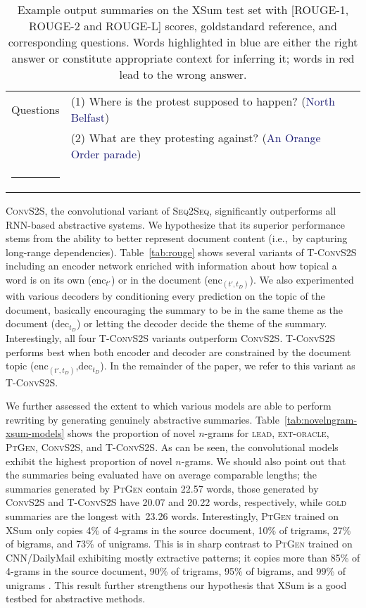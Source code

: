 \documentclass[11pt,a4paper]{article}
\makeatletter
\newcommand{\thickhline}{\noalign {\ifnum 0=`}\fi \hrule height 1pt
    \futurelet \reserved@a \@xhline
}
\makeatother
\begin{document}
\begin{table*}[t!]
{\begin{tabular}{l p{10.5cm} l}
      Questions &(1) {Where is the protest supposed to happen?}
      (\textcolor{midnightblue}{North Belfast}) \\ 
&(2) {What are they protesting against?} (\textcolor{midnightblue}{An Orange Order parade}) \\
      \thickhline

    \end{tabular}     
  }
  \caption{Example output summaries on the XSum test set with [ROUGE-1,
    ROUGE-2 and ROUGE-L] scores, goldstandard reference, and
    corresponding questions. Words highlighted in blue are either the
    right answer or constitute appropriate context for inferring it;
    words in red lead to the wrong
    answer. }\label{tab:erroranalysis}
\end{table*}


\textsc{ConvS2S}, the convolutional variant of \textsc{Seq2Seq},
significantly outperforms all \mbox{RNN-based} abstractive systems. We
hypothesize that its superior performance stems from the ability to
better represent document content (i.e.,~by capturing long-range
dependencies).
Table~\ref{tab:rouge} shows several variants of \textsc{T-ConvS2S}
including an encoder network enriched with information about how
topical a word is on its own (enc$_{t'}$) or in the document
(enc$_{(t',t_D)}$).  We also experimented with various decoders by
conditioning every prediction on the topic of the document, basically
encouraging the summary to be in the same theme as the document
(dec$_{t_D}$) or letting the decoder decide the theme of the
summary. Interestingly, all four \textsc{T-ConvS2S} variants
outperform \textsc{ConvS2S}. \textsc{T-ConvS2S} performs best when
both encoder and decoder are constrained by the document topic
(enc$_{(t',t_D)}$,dec$_{t_D}$). In the remainder of the paper, we
refer to this variant as \textsc{T-ConvS2S}.

We further assessed the extent to which various models are able to
perform rewriting by generating genuinely abstractive
summaries. Table~\ref{tab:novelngram-xsum-models} shows the proportion
of novel $n$-grams for \textsc{lead}, \textsc{ext-oracle},
\textsc{PtGen}, \textsc{ConvS2S}, and \textsc{T-ConvS2S}.  As can be
seen, the convolutional models exhibit the highest proportion of novel
$n$-grams. We should also point out that the summaries being evaluated
have on average comparable lengths; the summaries generated by
\textsc{PtGen} contain 22.57 words, those generated by
\textsc{ConvS2S} and \textsc{T-ConvS2S} have 20.07 and 20.22 words,
respectively, while \textsc{gold} summaries are the longest with~23.26
words.  Interestingly, \textsc{PtGen} trained on XSum only copies 4\%
of 4-grams in the source document, 10\% of trigrams, 27\% of bigrams,
and 73\% of unigrams. This is in sharp contrast to \textsc{PtGen}
trained on CNN/DailyMail exhibiting mostly extractive patterns; it
copies more than 85\% of 4-grams in the source document, 90\% of
trigrams, 95\% of bigrams, and 99\% of unigrams \cite{see-acl17}. This
result further strengthens our hypothesis that XSum is a good testbed
for abstractive methods.
\end{document}
